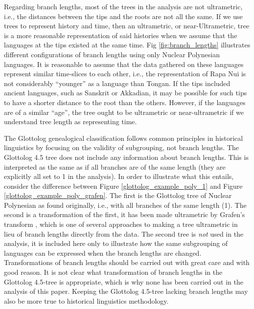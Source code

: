 \documentclass[12pt,letterpaper]{article}
\begin{document}
Regarding branch lengths, most of the trees in the analysis are not ultrametric, i.e., the distances between the tips and the roots are not all the same. If we use trees to represent history and time, then an ultrametric, or near-Ultrametric, tree is a more reasonable representation of said histories when we assume that the languages at the tips existed at the same time. Fig \ref{fig:branch_lengths} illustrates different configurations of branch lengths using only Nuclear Polynesian languages. It is reasonable to assume that the data gathered on these languages represent similar time-slices to each other, i.e., the representation of Rapa Nui is not considerably ``younger'' as a language than Tongan. If the tips included ancient languages, such as Sanskrit or Akkadian, it may be possible for such tips to have a shorter distance to the root than the others. However, if the languages are of a similar ``age'', the tree ought to be ultrametric or near-ultrametric if we understand tree length as representing time.

The Glottolog genealogical classification follows common principles in historical linguistics by focusing on the validity of subgrouping, not branch lengths. The Glottolog 4.5 tree does not include any information about branch lengths. This is interpreted as the same as if all branches are of the same length (they are explicitly all set to 1 in the analysis). In order to illustrate what this entails, consider the difference between Figure \ref{glottolog_example_poly_1} and Figure \ref{glottolog_example_poly_grafen}. The first is the Glottolog tree of Nuclear Polynesian as found originally, i.e., with all branches of the same length (1). The second is a transformation of the first, it has been made ultrametric by Grafen's transform \citep{grafen1989phylogenetic}, which is one of several approaches to making a tree ultrametric in lieu of branch lengths directly from the data. The second tree is \emph{not} used in the analysis, it is included here only to illustrate how the same subgrouping of languages can be expressed when the branch lengths are changed. Transformations of branch lengths should be carried out with great care and with good reason. It is not clear what transformation of branch lengths in the Glottolog 4.5-tree is appropriate, which is why none has been carried out in the analysis of this paper. Keeping the Glottolog 4.5-tree lacking branch lengths may also be more true to historical linguistics methodology.
\end{document}
